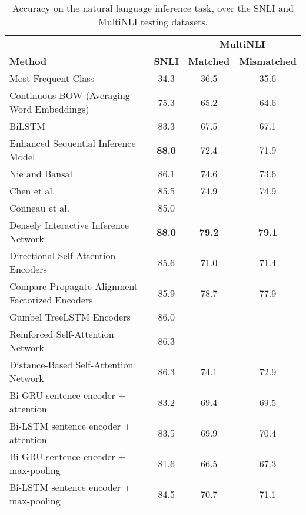 \begin{table}[t!]
\begin{center}
    \caption{Accuracy on the natural language inference task, over the SNLI and MultiNLI testing datasets.}
    \begin{tabular*}{\textwidth}{ l @{\extracolsep{\fill}} c @{\extracolsep{\fill}} c @{\extracolsep{\fill}} c @{\extracolsep{\fill}}}
    
       &  & \multicolumn{2}{c}{\textbf{MultiNLI}}\\
    \cline{3-4}
       \textbf{Method} & \textbf{SNLI} & \textbf{Matched} & \textbf{Mismatched} \\
      \hline
       Most Frequent Class & 34.3 & 36.5 & 35.6\\
       Continuous BOW (Averaging Word Embeddings) & 75.3 & 65.2 & 64.6\\
       BiLSTM & 83.3 & 67.5 & 67.1\\
        Enhanced Sequential Inference Model \cite{chen2017enhanced} & \textbf{88.0} & 72.4 & 71.9\\
       Nie and Bansal \cite{shortcut} & 86.1 & 74.6 & 73.6\\
       Chen et al. \cite{gated} & 85.5 & 74.9 & 74.9\\
       Conneau et al. \cite{supervised} & 85.0 & -- & --\\
       Densely Interactive Inference Network \cite{gong2017natural} & \textbf{88.0} & \textbf{79.2} & \textbf{79.1} \\
       Directional Self-Attention Encoders \cite{disan} & 85.6 & 71.0 & 71.4\\
       Compare-Propagate Alignment-Factorized Encoders \cite{cafe} & 85.9 & 78.7 & 77.9\\
       Gumbel TreeLSTM Encoders \cite{gumbel} & 86.0 & -- & --\\
       Reinforced Self-Attention Network \cite{shen2018reinforced} & 86.3 & -- & --\\
       Distance-Based Self-Attention Network \cite{im2017distance} & 86.3 & 74.1 & 72.9\\
       \hline
       Bi-GRU sentence encoder + attention & 83.2 & 69.4 & 69.5\\
       Bi-LSTM sentence encoder + attention & 83.5 & 69.9 & 70.4\\
       Bi-GRU sentence encoder + max-pooling & 81.6 & 66.5 & 67.3\\
       Bi-LSTM sentence encoder + max-pooling & 84.5 & 70.7 & 71.1\\

\end{tabular*}
\end{center}
\end{table}
